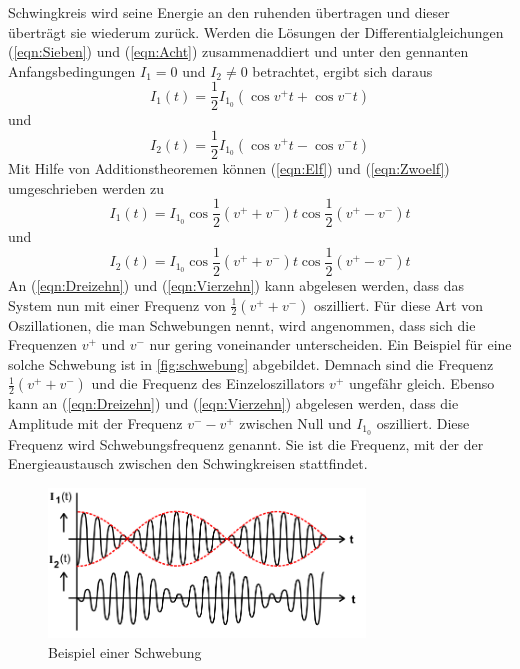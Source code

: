 Schwingkreis wird seine Energie an den ruhenden übertragen und dieser überträgt sie wiederum zurück.
\newline
Werden die Lösungen der Differentialgleichungen (\ref {eqn:Sieben}) und (\ref {eqn:Acht}) zusammenaddiert und unter den gennanten
Anfangsbedingungen $ I_1 = 0 $ und $ I_2 \neq 0 $ betrachtet, ergibt sich daraus
\begin{equation}
    I_1(t) = \frac{1}{2} I_{1_0} (\cos v^{+} t + \cos v^{-} t )
    \label{eqn:Elf}
\end{equation}
und
\begin{equation}
    I_2(t) = \frac{1}{2} I_{1_0} (\cos v^{+} t - \cos v^{-} t )
    \label{eqn:Zwoelf}
\end{equation}
Mit Hilfe von Additionstheoremen können (\ref {eqn:Elf}) und (\ref {eqn:Zwoelf}) umgeschrieben werden zu
\begin{equation}
    I_1(t) = I_{1_0} \cos \frac{1}{2} (v^{+} + v^{-}) t \cos \frac{1}{2} (v^{+} - v^{-}) t
    \label{eqn:Dreizehn}
\end{equation}
und
\begin{equation}
    I_2(t) = I_{1_0} \cos \frac{1}{2} (v^{+} + v^{-}) t \cos \frac{1}{2} (v^{+} - v^{-}) t
    \label{eqn:Vierzehn}
\end{equation}
\newline
An (\ref {eqn:Dreizehn}) und (\ref {eqn:Vierzehn}) kann abgelesen werden, dass das System nun mit einer Frequenz von $ \frac{1}{2} (v^{+} + v^{-}) $ oszilliert.
Für diese Art von Oszillationen, die man Schwebungen nennt, wird angenommen, dass sich die Frequenzen $ v^{+} $ und $ v^{-} $ nur gering voneinander unterscheiden.
Ein Beispiel für eine solche Schwebung ist in \autoref{fig:schwebung} abgebildet.
Demnach sind die Frequenz $ \frac{1}{2} (v^{+} + v^{-}) $ und die Frequenz des Einzeloszillators $ v^{+} $ ungefähr gleich.
\newline
Ebenso kann an (\ref {eqn:Dreizehn}) und (\ref {eqn:Vierzehn}) abgelesen werden, dass die Amplitude mit der Frequenz $ v^{-} - v^{+} $ zwischen Null und $ I_{1_0} $ oszilliert.
Diese Frequenz wird Schwebungsfrequenz genannt. Sie ist die Frequenz, mit der der Energieaustausch zwischen den Schwingkreisen stattfindet.

\begin{figure}[H]
    \centering
    \includegraphics[width=0.75\textwidth]{plots/Schwebung.png}
    \caption{Beispiel einer Schwebung \cite{Versuchsanleitung}}
    \label{fig:schwebung}
\end{figure}

